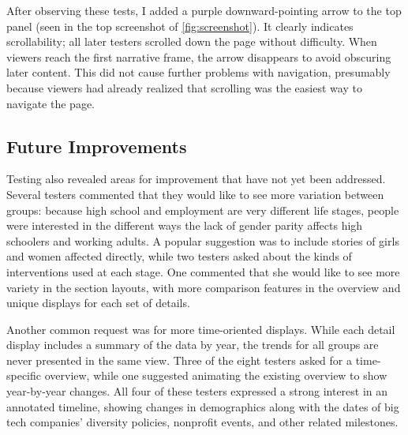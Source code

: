 After observing these tests, I added a purple downward-pointing arrow to the top panel (seen in the top screenshot of \autoref{fig:screenshot}). It clearly indicates scrollability; all later testers scrolled down the page without difficulty. When viewers reach the first narrative frame, the arrow disappears to avoid obscuring later content. This did not cause further problems with navigation, presumably because viewers had already realized that scrolling was the easiest way to navigate the page.

\subsection{Future Improvements}
Testing also revealed areas for improvement that have not yet been addressed. Several testers commented that they would like to see more variation between groups: because high school and employment are very different life stages, people were interested in the different ways the lack of gender parity affects high schoolers and working adults. A popular suggestion was to include stories of girls and women affected directly, while two testers asked about the kinds of interventions used at each stage. One commented that she would like to see more variety in the section layouts, with more comparison features in the overview and unique displays for each set of details.

Another common request was for more time-oriented displays. While each detail display includes a summary of the data by year, the trends for all groups are never presented in the same view. Three of the eight testers asked for a time-specific overview, while one suggested animating the existing overview to show year-by-year changes. All four of these testers expressed a strong interest in an annotated timeline, showing changes in demographics along with the dates of big tech companies' diversity policies, nonprofit events, and other related milestones.
